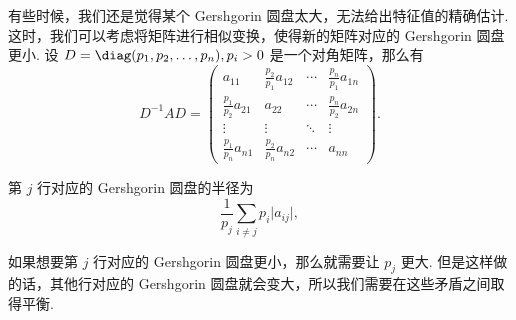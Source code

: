 有些时候，我们还是觉得某个 Gershgorin 圆盘太大，无法给出特征值的精确估计. 这时，我们可以考虑将矩阵进行相似变换，使得新的矩阵对应的 Gershgorin 圆盘更小. 设 $D = \diag(p_1, p_2, \ldots, p_n), p_i > 0$ 是一个对角矩阵，那么有 \[
    D^{-1} A D = \begin{pmatrix}
        a_{11}                 & \frac{p_2}{p_1} a_{12} & \cdots & \frac{p_n}{p_1} a_{1n} \\
        \frac{p_1}{p_2} a_{21} & a_{22}                 & \cdots & \frac{p_n}{p_2} a_{2n} \\
        \vdots                 & \vdots                 & \ddots & \vdots                 \\
        \frac{p_1}{p_n} a_{n1} & \frac{p_2}{p_n} a_{n2} & \cdots & a_{nn}
    \end{pmatrix}.
\]

第 $j$ 行对应的 Gershgorin 圆盘的半径为 \[
    \frac{1}{p_j} \sum_{i \neq j} p_i \lvert a_{ij} \rvert,
\]

如果想要第 $j$ 行对应的 Gershgorin 圆盘更小，那么就需要让 $p_j$ 更大. 但是这样做的话，其他行对应的 Gershgorin 圆盘就会变大，所以我们需要在这些矛盾之间取得平衡.

